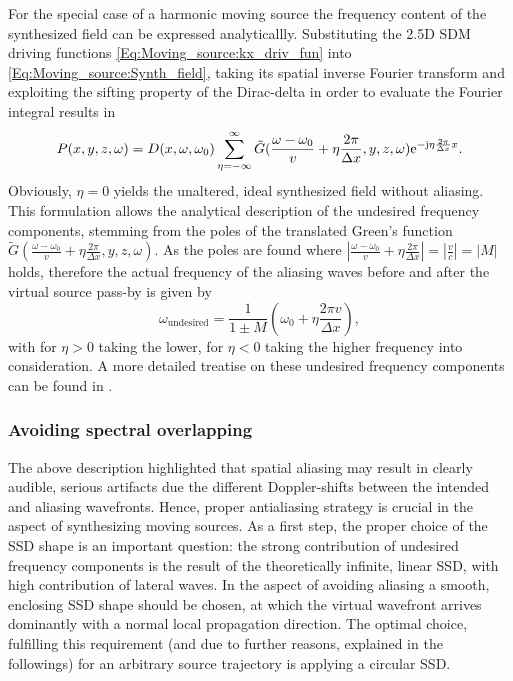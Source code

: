 For the special case of a harmonic moving source the frequency content of the synthesized field can be expressed analyticallly.
Substituting the 2.5D SDM driving functions \eqref{Eq:Moving_source:kx_driv_fun} into \eqref{Eq:Moving_source:Synth_field}, taking its spatial inverse Fourier transform and exploiting the sifting property of the Dirac-delta in order to evaluate the Fourier integral results in
\begin{equation}
P(x,y,z,\omega) = 
D(x,\omega,\omega_0)
\sum_{\eta = -\infty}^{\infty}
\tilde{G}( \frac{\omega-\omega_0}{v} +  \eta \frac{2\pi}{\Delta x},y,z, \omega )
 \mathrm{e}^{-\mathrm{j}  \eta \frac{2\pi}{\Delta x}  x}.
\end{equation}
Obviously, $\eta = 0$ yields the unaltered, ideal synthesized field without aliasing.
This formulation allows the analytical description of the undesired frequency components, stemming from the poles of the translated Green's function $\tilde{G}( \frac{\omega-\omega_0}{v} +  \eta \frac{2\pi}{\Delta x},y,z, \omega )$.
As the poles are found where $|\frac{\omega-\omega_0}{v} +  \eta \frac{2\pi}{\Delta x}| = |\frac{v}{c}| = |M|$ holds, therefore the actual frequency of the aliasing waves before and after the virtual source pass-by is given by
\begin{equation}
\omega_{\mathrm{undesired}} = \frac{1}{1 \pm M} \left( \omega_0 + \eta \frac{2\pi v}{\Delta x} \right),
\end{equation}
with for $\eta > 0$ taking the lower, for $\eta < 0$ taking the higher frequency into consideration.
A more detailed treatise on these undesired frequency components can be found in \cite{firtha2016:daga}.

\subsubsection{Avoiding spectral overlapping}
The above description highlighted that spatial aliasing may result in clearly audible, serious artifacts due the different Doppler-shifts between the intended and aliasing wavefronts.
Hence, proper antialiasing strategy is crucial in the aspect of synthesizing moving sources.
As a first step, the proper choice of the SSD shape is an important question: the strong contribution of undesired frequency components is the result of the theoretically infinite, linear SSD, with high contribution of lateral waves.
In the aspect of avoiding aliasing a smooth, enclosing SSD shape should be chosen, at which the virtual wavefront arrives dominantly with a normal local propagation direction.
The optimal choice, fulfilling this requirement (and due to further reasons, explained in the followings) for an arbitrary source trajectory is applying a circular SSD.

